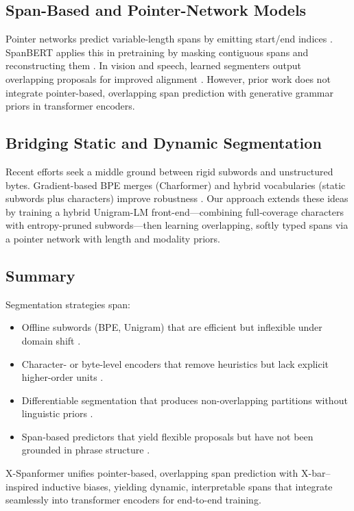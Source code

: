 \subsection{Span-Based and Pointer-Network Models}
Pointer networks predict variable-length spans by emitting start/end indices \cite{vinyals2015pointer}.  SpanBERT applies this in pretraining by masking contiguous spans and reconstructing them \cite{joshi2020spanbert}.  In vision and speech, learned segmenters output overlapping proposals for improved alignment \cite{ren2015faster,zach2019segmenter}.  However, prior work does not integrate pointer-based, overlapping span prediction with generative grammar priors in transformer encoders.

\subsection{Bridging Static and Dynamic Segmentation}
Recent efforts seek a middle ground between rigid subwords and unstructured bytes.  Gradient-based BPE merges (Charformer) and hybrid vocabularies (static subwords plus characters) improve robustness \cite{tay2021charformer,clark2021canine}.  Our approach extends these ideas by training a hybrid Unigram-LM front-end—combining full‐coverage characters with entropy-pruned subwords—then learning overlapping, softly typed spans via a pointer network with length and modality priors.

\subsection{Summary}
Segmentation strategies span:

\begin{itemize}
	\item Offline subwords (BPE, Unigram) that are efficient but inflexible under domain shift \cite{sennrich2016bpe,kudo2018sentencepiece,galle2021respite}.
	\item Character- or byte-level encoders that remove heuristics but lack explicit higher-order units \cite{tay2021charformer,clark2021canine,xue2022byt5}.
	\item Differentiable segmentation that produces non-overlapping partitions without linguistic priors \cite{creutz2005unsupervised,liu2022learnedsegmentation,liu2022pmlm}.
	\item Span-based predictors that yield flexible proposals but have not been grounded in phrase structure \cite{vinyals2015pointer,joshi2020spanbert}.
\end{itemize}

X-Spanformer unifies pointer-based, overlapping span prediction with X-bar–inspired inductive biases, yielding dynamic, interpretable spans that integrate seamlessly into transformer encoders for end-to-end training.